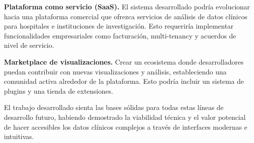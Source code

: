 \textbf{Plataforma como servicio (SaaS).} El sistema desarrollado podría evolucionar hacia una plataforma comercial que ofrezca servicios de análisis de datos clínicos para hospitales e instituciones de investigación. Esto requeriría implementar funcionalidades empresariales como facturación, multi-tenancy y acuerdos de nivel de servicio.

\textbf{Marketplace de visualizaciones.} Crear un ecosistema donde desarrolladores puedan contribuir con nuevas visualizaciones y análisis, estableciendo una comunidad activa alrededor de la plataforma. Esto podría incluir un sistema de plugins y una tienda de extensiones.

El trabajo desarrollado sienta las bases sólidas para todas estas líneas de desarrollo futuro, habiendo demostrado la viabilidad técnica y el valor potencial de hacer accesibles los datos clínicos complejos a través de interfaces modernas e intuitivas.

